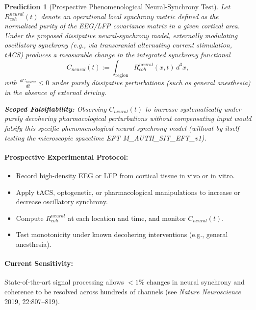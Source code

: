 \documentclass[american,11pt,letterpaper]{article}
\newtheorem{prediction}{Prediction}
\def\mathcal#1{#1}%
\def\mathrm#1{#1}%
\def\texttt#1{#1}%
\begin{document}
\begin{prediction}[Prospective Phenomenological Neural-Synchrony Test]
Let $R_{\mathrm{coh}}^{\mathrm{neural}}(t)$ denote an operational local synchrony metric defined as the normalized purity of the EEG/LFP covariance matrix in a given cortical area. Under the proposed dissipative neural-synchrony model, externally modulating oscillatory synchrony (e.g., via transcranial alternating current stimulation, tACS) produces a measurable change in the integrated synchrony functional
\[
\mathcal{C}_{\mathrm{neural}}(t) := \int_{\text{region}} R_{\mathrm{coh}}^{\mathrm{neural}}(x, t)\, d^3x,
\]
with $\frac{d \mathcal{C}_{\mathrm{neural}}}{dt} \leq 0$ under purely dissipative perturbations (such as general anesthesia) in the absence of external driving.

\textbf{Scoped Falsifiability:} Observing $\mathcal{C}_{\mathrm{neural}}(t)$ to increase systematically under purely decohering pharmacological perturbations without compensating input would falsify this specific phenomenological neural-synchrony model (without by itself testing the microscopic spacetime EFT \texttt{M\_AUTH\_SIT\_EFT\_v1}).
\end{prediction}

\paragraph{Prospective Experimental Protocol:}
\begin{itemize}
    \item Record high-density EEG or LFP from cortical tissue in vivo or in vitro.
    \item Apply tACS, optogenetic, or pharmacological manipulations to increase or decrease oscillatory synchrony.
    \item Compute $R_{\mathrm{coh}}^{\mathrm{neural}}$ at each location and time, and monitor $\mathcal{C}_{\mathrm{neural}}(t)$.
    \item Test monotonicity under known decohering interventions (e.g., general anesthesia).
\end{itemize}

\paragraph{Current Sensitivity:}
State-of-the-art signal processing allows $<1\%$ changes in neural synchrony and coherence to be resolved across hundreds of channels (see \textit{Nature Neuroscience} 2019, 22:807--819).
\end{document}
